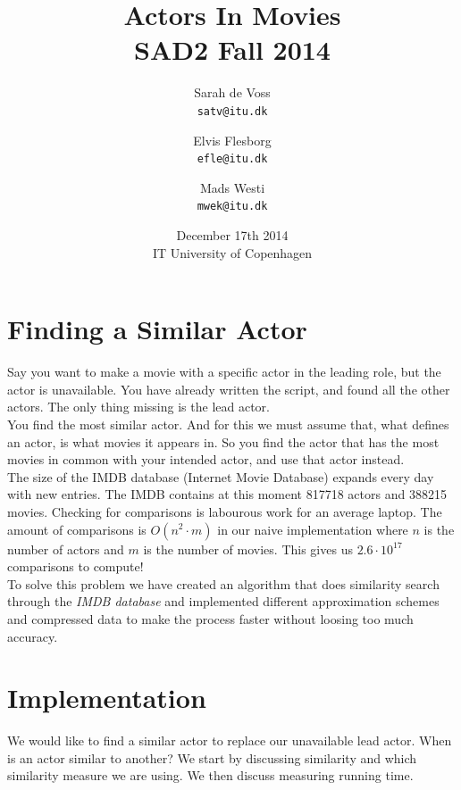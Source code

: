 \documentclass[a4paper,11pt]{article}
\begin{document}
\setlength{\parindent}{0cm}
\setlength{\unitlength}{1mm}
\date{December 17th 2014\\ IT University of Copenhagen}
\title{Actors In Movies\\SAD2 Fall 2014}

\author{Sarah de Voss\\
\texttt{satv@itu.dk}
\and Elvis Flesborg\\
\texttt{efle@itu.dk}
\and Mads Westi\\
\texttt{mwek@itu.dk}}
\clearpage\maketitle

\thispagestyle{empty}
\newpage
\tableofcontents
\thispagestyle{empty}
\newpage

\setcounter{page}{1}
\section{Finding a Similar Actor}

Say you want to make a movie with a specific actor in the leading role, but the actor is unavailable. You have already written the script, and found all the other actors. The only thing missing is the lead actor. \\

You find the most similar actor. And for this we must assume that, what defines an actor, is what movies it appears in. So you find the actor that has the most movies in common with your intended actor, and use that actor instead. \\

The size of the IMDB database (Internet Movie Database) expands every day with new entries. The IMDB contains at this moment 817718 actors and 388215 movies. Checking for comparisons is labourous work for an average laptop. The amount of comparisons is $O(n^2\cdot m)$ in our naive implementation where $n$ is the number of actors and $m$ is the number of movies. This gives us $2.6\cdot 10^{17}$ comparisons to compute!\\

To solve this problem we have created an algorithm that does similarity search through the \emph{IMDB database} and implemented different approximation schemes and compressed data to make the process faster without loosing too much accuracy.


\section{Implementation}
We would like to find a similar actor to replace our unavailable lead actor. When is an actor similar to another? We start by discussing similarity and which similarity measure we are using. We then discuss measuring running time.\\
\end{document}
